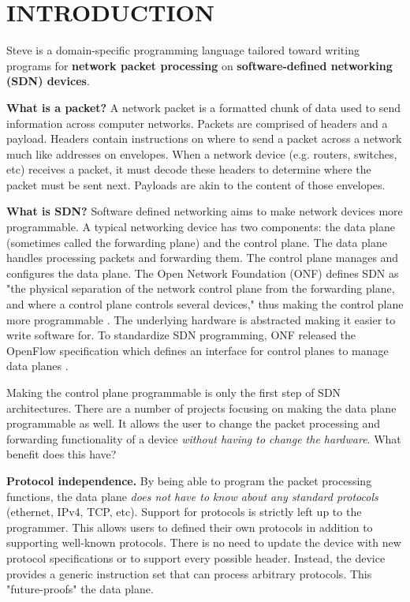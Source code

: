 \chapter{INTRODUCTION} \label{ch:intro}

Steve is a domain-specific programming language tailored toward writing programs for \textbf{network packet processing} on \textbf{software-defined networking (SDN) devices}. 

\textbf{What is a packet?} A network packet is a formatted chunk of data used to send information across computer networks. Packets are comprised of headers and a payload. Headers contain instructions on where to send a packet across a network much like addresses on envelopes. When a network device (e.g. routers, switches, etc) receives a packet, it must decode these headers to determine where the packet must be sent next. Payloads are akin to the content of those envelopes. 

\textbf{What is SDN?} Software defined networking aims to make network devices more programmable. A typical networking device has two components: the data plane (sometimes called the forwarding plane) and the control plane. The data plane handles processing packets and forwarding them. The control plane manages and configures the data plane. The Open Network Foundation (ONF) defines SDN as "the physical separation of the network control plane from the forwarding plane, and where a control plane controls several devices," thus making the control plane more programmable \cite{onf_sdn_def}. The underlying hardware is abstracted making it easier to write software for. To standardize SDN programming, ONF released the OpenFlow specification which defines an interface for control planes to manage data planes \cite{openflow_spec}.

Making the control plane programmable is only the first step of SDN architectures. There are a number of projects focusing on making the data plane programmable as well. It allows the user to change the packet processing and forwarding functionality of a device \textit{without having to change the hardware}. What benefit does this have?

\textbf{Protocol independence.} By being able to program the packet processing functions, the data plane \textit{does not have to know about any standard protocols} (ethernet, IPv4, TCP, etc). Support for protocols is strictly left up to the programmer. This allows users to defined their own protocols in addition to supporting well-known protocols. There is no need to update the device with new protocol specifications or to support every possible header. Instead, the device provides a generic instruction set that can process arbitrary protocols. This "future-proofs" the data plane.

